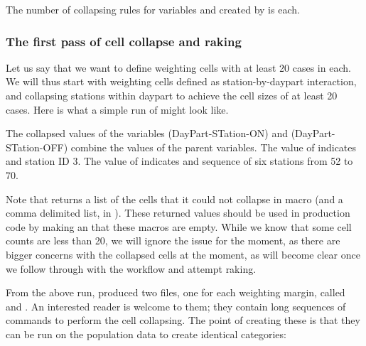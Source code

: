 \begin{stlog}
\nullskip
\end{stlog}

The number of collapsing rules for variables  and 
created by 
is \nullskip each.

\subsubsection{The first pass of cell collapse and raking}

Let us say that we want to define weighting cells with at least 20 cases in each.
We will thus start with weighting cells defined as station-by-daypart interaction,
and collapsing stations within daypart to achieve the cell sizes of at least 20 cases.
Here is what a simple run of  might look like.

\begin{stlog}
\nullskip
\end{stlog}

The collapsed values of the variables  (DayPart-STation-ON) and
 (DayPart-STation-OFF) combine the values of the parent variables. The value
of  indicates  and station ID 3.
The value of  indicates  and sequence of
six stations from 52 to 70.
\label{page:dpston:nomenclature}

Note that  returns a list of the cells that it could not
collapse in  macro (and a comma delimited list, in ).
These returned values should be used in production code by making an 
\citep{gould:2003:tip3} that these macros are empty.
While we know that some cell counts are less than 20, we will ignore the issue
for the moment, as there are bigger concerns with the collapsed cells at the moment,
as will become clear once we follow through with the workflow and attempt raking.

From the above run,  produced two files, one for each
weighting margin, called  and . An interested reader
is welcome to  them; they contain long sequences of 
commands to perform the cell collapsing. The point of creating these is that they
can be run on the population data to create identical categories:

